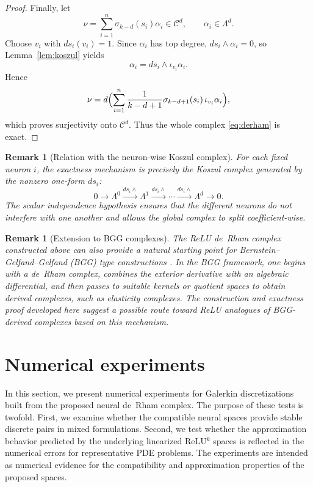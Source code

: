 \documentclass[pdflatex,sn-mathphys-num]{sn-jnl}
\newtheorem{remark}[theorem]{Remark}
\numberwithin{equation}{section}
\numberwithin{theorem}{section}
\numberwithin{table}{section}
\numberwithin{figure}{section}
\begin{document}
\begin{proof}
Finally, let
\begin{equation}
\nu=\sum_{i=1}^n \sigma_{k-d}(s_i)\alpha_i\in\mathcal C ^d,
\qquad \alpha_i\in\Lambda^d.
\end{equation}
Choose $v_i$ with $ds_i(v_i)=1$. Since $\alpha_i$ has top degree, $ds_i\wedge\alpha_i=0$, so Lemma~\ref{lem:koszul} yields
\begin{equation}
\alpha_i=ds_i\wedge\iota_{v_i}\alpha_i.
\end{equation}
Hence
\begin{equation}
\nu
=d\Bigl(\sum_{i=1}^n \frac{1}{k-d+1}\sigma_{k-d+1}(s_i)\,\iota_{v_i}\alpha_i\Bigr),
\end{equation}
which proves surjectivity onto $\mathcal C ^d$.
Thus the whole complex \eqref{eq:derham} is exact.
\end{proof}

\begin{remark}[Relation with the neuron-wise Koszul complex]
    For each fixed neuron $i$, the exactness mechanism is precisely the Koszul complex generated by the nonzero one-form $ds_i$:
    \begin{equation}
    0\to \Lambda^0 \xrightarrow{ds_i\wedge}\Lambda^1\xrightarrow{ds_i\wedge}\cdots
    \xrightarrow{ds_i\wedge}\Lambda^d\to 0.
    \end{equation}
    The scalar independence hypothesis ensures that the different neurons do not interfere with one another and allows the global complex to split coefficient-wise.
\end{remark}

\begin{remark}[Extension to BGG complexes]
The ReLU de~Rham complex constructed above can also provide a natural starting point for Bernstein--Gelfand--Gelfand (BGG) type constructions \cite{arnold2021complexes}. In the BGG framework, one begins with a de~Rham complex, combines the exterior derivative with an algebraic differential, and then passes to suitable kernels or quotient spaces to obtain derived complexes, such as elasticity complexes. The construction and exactness proof developed here suggest a possible route toward ReLU analogues of BGG-derived complexes based on this mechanism.
\end{remark}





\section{Numerical experiments}\label{sec:numerical}
In this section, we present numerical experiments for Galerkin discretizations built from the proposed neural de~Rham complex.  The purpose of these tests is twofold.  First, we examine whether the compatible neural spaces provide stable discrete pairs in mixed formulations.  Second, we test whether the approximation behavior predicted by the underlying linearized ReLU$^k$ spaces is reflected in the numerical errors for representative PDE problems.  The experiments are intended as numerical evidence for the compatibility and approximation properties of the proposed spaces.
\end{document}

